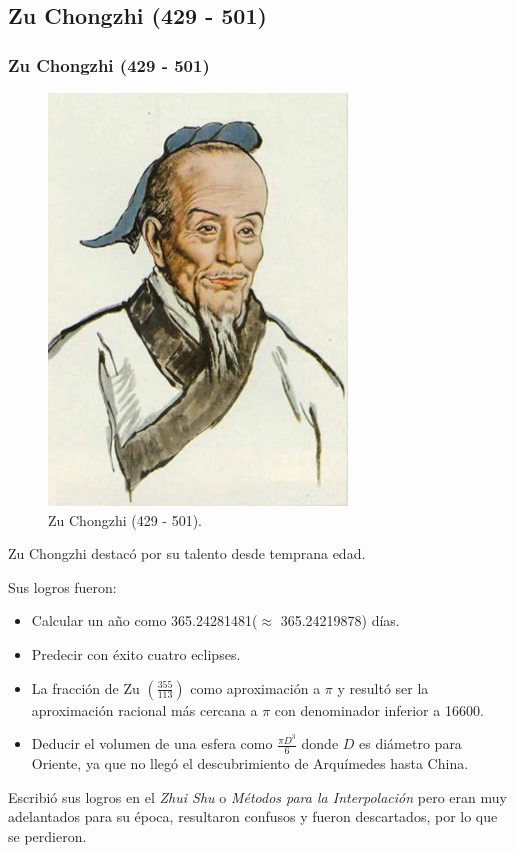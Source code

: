 \documentclass[compress, aspectratio=169]{beamer} %
\begin{document}
	\subsection{Zu Chongzhi (429 - 501)}
		\begin{frame}
			\frametitle{Zu Chongzhi (429 - 501)}
			\begin{figure}
				\centering
				\includegraphics[width = .25\linewidth]{zu_chongzhi.jpg}
				\caption{Zu Chongzhi (429 - 501).}
			\end{figure}
		\end{frame}
					
		\begin{frame}
			Zu Chongzhi destacó por su talento desde temprana edad.
			
			Sus logros fueron:
			\pause
			\begin{itemize}
				\item Calcular un año como 365.24281481($\approx$ 365.24219878) días.
				\item Predecir con éxito cuatro eclipses.
				\pause
				\item La fracción de Zu $\displaystyle \left(\frac{355}{113}\right)$ como aproximación a $\pi$ y
				resultó ser la aproximación racional más cercana a $\pi$ con denominador inferior a 16600.
				\pause
				\item Deducir el volumen de una esfera como $\displaystyle \frac{\pi D^3}{6}$ donde $D$ es diámetro para Oriente,
				ya que no llegó el descubrimiento de Arquímedes hasta China.
			\end{itemize}
			
			\pause
			
			Escribió sus logros en el \textit{Zhui Shu} o \textit{Métodos para la Interpolación} pero eran muy
			adelantados para su época, resultaron confusos y fueron descartados, por lo que se perdieron.
		\end{frame}
\end{document}
